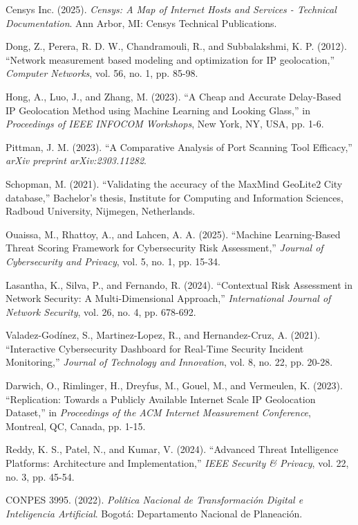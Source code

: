 \begin{thebibliography}{50}
Censys Inc. (2025). \textit{Censys: A Map of Internet Hosts and Services - Technical Documentation}. Ann Arbor, MI: Censys Technical Publications.

Dong, Z., Perera, R. D. W., Chandramouli, R., and Subbalakshmi, K. P. (2012). ``Network measurement based modeling and optimization for IP geolocation,'' \textit{Computer Networks}, vol. 56, no. 1, pp. 85-98.

Hong, A., Luo, J., and Zhang, M. (2023). ``A Cheap and Accurate Delay-Based IP Geolocation Method using Machine Learning and Looking Glass,'' in \textit{Proceedings of IEEE INFOCOM Workshops}, New York, NY, USA, pp. 1-6.

Pittman, J. M. (2023). ``A Comparative Analysis of Port Scanning Tool Efficacy,'' \textit{arXiv preprint arXiv:2303.11282}.

Schopman, M. (2021). ``Validating the accuracy of the MaxMind GeoLite2 City database,'' Bachelor's thesis, Institute for Computing and Information Sciences, Radboud University, Nijmegen, Netherlands.

Ouaissa, M., Rhattoy, A., and Lahcen, A. A. (2025). ``Machine Learning-Based Threat Scoring Framework for Cybersecurity Risk Assessment,'' \textit{Journal of Cybersecurity and Privacy}, vol. 5, no. 1, pp. 15-34.

Lasantha, K., Silva, P., and Fernando, R. (2024). ``Contextual Risk Assessment in Network Security: A Multi-Dimensional Approach,'' \textit{International Journal of Network Security}, vol. 26, no. 4, pp. 678-692.

Valadez-Godínez, S., Martinez-Lopez, R., and Hernandez-Cruz, A. (2021). ``Interactive Cybersecurity Dashboard for Real-Time Security Incident Monitoring,'' \textit{Journal of Technology and Innovation}, vol. 8, no. 22, pp. 20-28.

Darwich, O., Rimlinger, H., Dreyfus, M., Gouel, M., and Vermeulen, K. (2023). ``Replication: Towards a Publicly Available Internet Scale IP Geolocation Dataset,'' in \textit{Proceedings of the ACM Internet Measurement Conference}, Montreal, QC, Canada, pp. 1-15.

Reddy, K. S., Patel, N., and Kumar, V. (2024). ``Advanced Threat Intelligence Platforms: Architecture and Implementation,'' \textit{IEEE Security \& Privacy}, vol. 22, no. 3, pp. 45-54.

CONPES 3995. (2022). \textit{Política Nacional de Transformación Digital e Inteligencia Artificial}. Bogotá: Departamento Nacional de Planeación.


\end{thebibliography}
